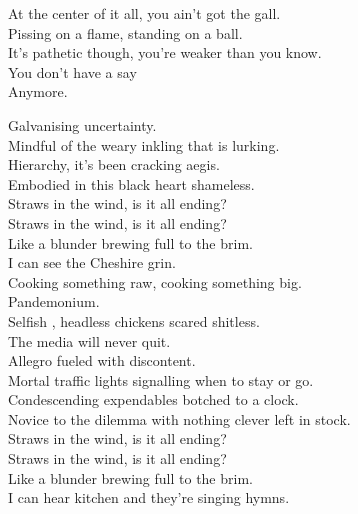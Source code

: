 At the center of it all, you ain't got the gall. \\
Pissing on a flame, standing on a ball. \\
It's pathetic though, you're weaker than you know. \\
You don't have a say \\
Anymore. \\





Galvanising uncertainty. \\
Mindful of the weary inkling that is lurking. \\
Hierarchy, it's been cracking aegis. \\
Embodied in this black heart shameless. \\

Straws in the wind, is it all ending? \\
Straws in the wind, is it all ending? \\
Like a blunder brewing full to the brim. \\
I can see the  Cheshire grin. \\

Cooking something raw, cooking something big. \\
Pandemonium. \\
Selfish , headless chickens scared shitless. \\
The media will never quit. \\

Allegro fueled with discontent. \\
Mortal traffic lights signalling when to stay or go. \\
Condescending expendables botched to a clock. \\
Novice to the dilemma with nothing clever left in stock. \\

Straws in the wind, is it all ending? \\
Straws in the wind, is it all ending? \\
Like a blunder brewing full to the brim. \\
I can hear  kitchen and they're singing hymns. \\

